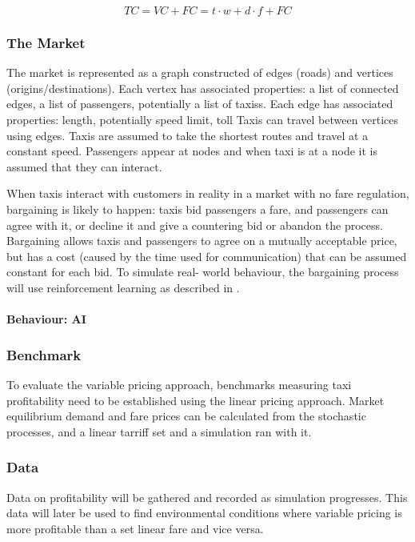\[ TC = VC + FC = t \cdot w + d \cdot f + FC \]

\subsubsection{The Market}

The market is represented as a graph constructed of edges (roads) and vertices
(origins/destinations). Each vertex has associated properties: a list of
connected edges, a list of passengers, potentially a list of taxiss. Each edge
has associated properties: length, potentially speed limit, toll Taxis can
travel between vertices using edges. Taxis are assumed to take the shortest
routes and travel at a constant speed. Passengers appear at nodes and when taxi
is at a node it is assumed that they can interact.

When taxis interact with customers in reality in a market with no fare
regulation, bargaining is likely to happen: taxis bid passengers a fare, and
passengers can agree with it, or decline it and give a countering bid or
abandon the process. Bargaining allows taxis and passengers to agree on a
mutually acceptable price, but has a cost (caused by the time used for
communication) that can be assumed constant for each bid. To simulate real-
world behaviour, the bargaining process will use reinforcement learning as
described in \textcite{Cli1997taxi+bargaining}.

\paragraph{Behaviour: AI}

\subsubsection{Benchmark} 

To evaluate the variable pricing approach, benchmarks measuring taxi
profitability need to be established using the linear pricing approach. Market
equilibrium demand and fare prices can be calculated from the stochastic
processes, and a linear tarriff set and a simulation ran with it.

\subsubsection{Data}

Data on profitability will be gathered and recorded as simulation progresses.
This data will later be used to find environmental conditions where variable
pricing is more profitable than a set linear fare and vice versa.

